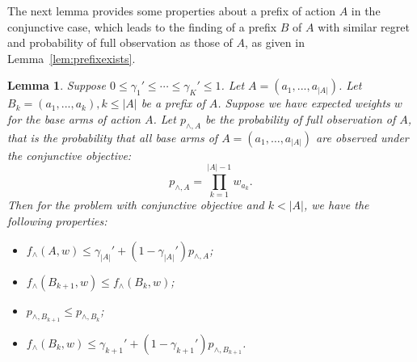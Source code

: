 \documentclass{article}
\newcommand{\abs}[1]{\left| #1 \right|}
\newtheorem{lemma}[theorem]{Lemma}%
\begin{document}
The next lemma provides some properties about a prefix of action $A$ in the conjunctive case, which leads to the finding of a prefix $B$ of $A$ with similar regret and probability of full observation as those of $A$, as given in Lemma~\ref{lem:prefixexists}.
\begin{lemma} %
  \label{lem:prefixRelation}
  Suppose $0 \leq \gamma_1' \leq \cdots \leq \gamma_K' \leq 1$. Let $A = (a_1, ..., a_{\abs{A}})$. 
  Let $B_k = (a_1, ..., a_k), k \leq \abs{A}$ be a prefix of $A$. 
  Suppose we have expected weights $w$ for the base arms of action $A$. 
  Let $p_{\wedge, A}$ be the {\em probability of full observation of $A$}, that is the probability that all base arms of $A = (a_1, \ldots, a_{\abs{A}})$ are observed under the conjunctive objective:
  $$
    p_{\wedge, A} = \prod_{k=1}^{\abs{A}-1} w_{a_k}.
  $$
  Then for the problem with conjunctive objective and $k < \abs{A}$, we have the following properties:
  \begin{itemize}
  	\item[(1)] $f_{\wedge}(A, w) \leq \gamma_{\abs{A}}' + (1 - \gamma_{\abs{A}}') p_{\wedge, A}$;
  	\item[(2)] $f_{\wedge}(B_{k+1}, w) \leq f_{\wedge}(B_k, w)$;
  	\item[(3)] $p_{\wedge, B_{k+1}} \leq p_{\wedge, B_k}$;
  	\item[(4)] $f_{\wedge}(B_k, w) \leq \gamma_{k+1}' + (1 - \gamma_{k+1}') p_{\wedge,B_{k+1}}$.
  \end{itemize}
\end{lemma}
\end{document}
